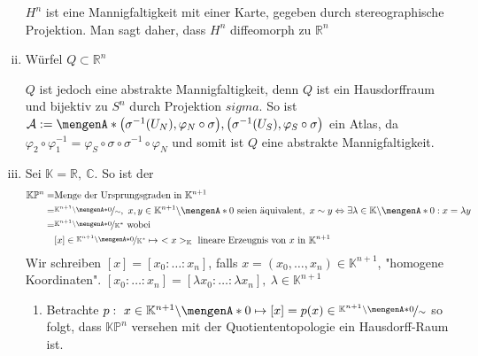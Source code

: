 \begin{enumerate}[(i)]
		$H^n$ ist eine Mannigfaltigkeit mit einer Karte, gegeben durch stereographische Projektion. Man sagt daher, dass $H^n$ diffeomorph zu $\mathds{R}^n$
		\item Würfel $Q\subset \mathds{R}^n$
		\begin{figure}[H]
		\end{figure}
		$Q$ ist jedoch eine abstrakte Mannigfaltigkeit, denn $Q$ ist ein Hausdorffraum und bijektiv zu $S^n$ durch Projektion $sigma$. So ist $\mathcal{A} := \set{\enbrace*{\sigma^{-1}(U_N),\varphi_N \circ \sigma},\enbrace*{\sigma^{-1}(U_S),\varphi_S \circ \sigma}}$ ein Atlas, da $\varphi_2 \circ \varphi_1^{-1} = \varphi_S \circ \sigma \circ \sigma^{-1} \circ \varphi_N$ und somit ist $Q$ eine abstrakte Mannigfaltigkeit.
		\item Sei $\mathds{K} = \mathds{R},\ \mathds{C}$. So ist der 
		\begin{align*}
			\mathds{K}\mathds{P}^n =& \text{Menge der Ursprungsgraden in $\mathds{K}^{n+1}$}\\
			=& \nicefrac{\mathds{K}^{n+1}\backslash \set{0}}{\sim},\ x,y\in \mathds{K}^{n+1}\backslash \set{0}\ \text{seien äquivalent},\ x\sim y \Leftrightarrow \exists \lambda\in \mathds{K}\backslash \set{0}: x = \lambda y\\
			=& \nicefrac{\mathds{K}^{n+1}\backslash \set{0}}{\mathds{K}^*}\ \text{wobei}\\
			&[x]\in \nicefrac{\mathds{K}^{n+1}\backslash \set{0}}{\mathds{K}^*} \mapsto\ <x>_{\mathds{K}}\ \text{lineare Erzeugnis von $x$ in $\mathds{K}^{n+1}$}
		\end{align*}
		Wir schreiben $[x] = [x_0:\ldots:x_n]$, falls $x=(x_0,\ldots,x_n)\in \mathds{K}^{n+1}$, "homogene Koordinaten".
		 $[x_0:\ldots:x_n] = [\lambda x_0:\ldots:\lambda x_n],\ \lambda \in \mathds{K}^{n+1}$
		\begin{enumerate}[(1)]
			\item Betrachte $p:\ x\in \mathds{K}^{n+1}\backslash \set{0} \mapsto [x] = p(x)\in \nicefrac{\mathds{K}^{n+1}\backslash \set{0}}{\sim}$ so folgt, dass $\mathds{K}\mathds{P}^n$ versehen mit der Quotiententopologie ein Hausdorff-Raum ist.

\end{enumerate}
\end{enumerate}
